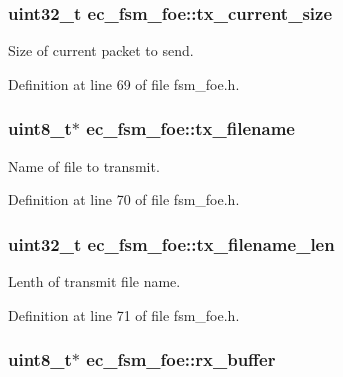 \subsubsection[{tx\-\_\-current\-\_\-size}]{\setlength{\rightskip}{0pt plus 5cm}uint32\-\_\-t {\bf ec\-\_\-fsm\-\_\-foe\-::tx\-\_\-current\-\_\-size}}\label{structec__fsm__foe_afca679da6083ed8c5dd4559941938527}


\-Size of current packet to send. 



\-Definition at line 69 of file fsm\-\_\-foe.\-h.

\subsubsection[{tx\-\_\-filename}]{\setlength{\rightskip}{0pt plus 5cm}uint8\-\_\-t$\ast$ {\bf ec\-\_\-fsm\-\_\-foe\-::tx\-\_\-filename}}\label{structec__fsm__foe_a9861ec153889855a1fa74c1bada87865}


\-Name of file to transmit. 



\-Definition at line 70 of file fsm\-\_\-foe.\-h.

\subsubsection[{tx\-\_\-filename\-\_\-len}]{\setlength{\rightskip}{0pt plus 5cm}uint32\-\_\-t {\bf ec\-\_\-fsm\-\_\-foe\-::tx\-\_\-filename\-\_\-len}}\label{structec__fsm__foe_a752483ab511b3c67efe4e1e111d6693f}


\-Lenth of transmit file name. 



\-Definition at line 71 of file fsm\-\_\-foe.\-h.

\subsubsection[{rx\-\_\-buffer}]{\setlength{\rightskip}{0pt plus 5cm}uint8\-\_\-t$\ast$ {\bf ec\-\_\-fsm\-\_\-foe\-::rx\-\_\-buffer}}\label{structec__fsm__foe_a2141eab8b9b4821e6714c4873114d93e}


